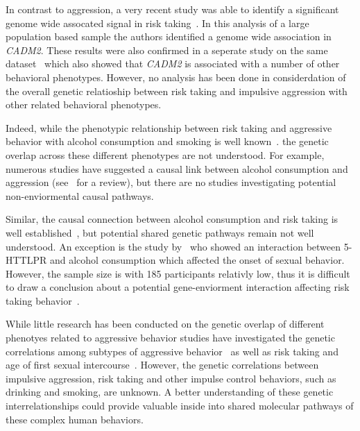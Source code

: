 In contrast to aggression, a very recent study was able to identify a significant genome wide assocated signal in risk taking~\cite{Day2016}. 
In this analysis of a large population based sample the authors identified a genome wide association in \textit{CADM2}.
These results were also confirmed in a seperate study on the same dataset~\cite{Boutwell2017} which also showed that \textit{CADM2} is associated with a number of other behavioral phenotypes.
However, no analysis has been done in considerdation of the overall genetic relatioship between risk taking and impulsive aggression with other related behavioral phenotypes.

Indeed, while the phenotypic relationship between risk taking and aggressive behavior with alcohol consumption and smoking is well known~\cite{FRANZKOWIAX1987,Zuckerman2000,Dakwar2011}.
the genetic overlap across these different phenotypes are not understood.
For example, numerous studies have suggested a causal link between alcohol consumption and aggression (see~\citet{Bushman1990} for a review), but there are no studies investigating potential non-enviormental causal pathways.

Similar, the causal connection between alcohol consumption and risk taking is well established~\cite{Lane2004}, but potential shared genetic pathways remain not well understood.
An exception is the study by~\cite{Kogan2010} who showed an interaction between 5-HTTLPR and alcohol consumption which affected the onset of sexual behavior. 
However, the sample size is with 185 participants relativly low, thus it is difficult to draw a conclusion about a potential gene-enviorment interaction affecting risk taking behavior~\cite{Rubens2016}.

While little research has been conducted on the genetic overlap of different phenotyes related to aggressive behavior studies have investigated the genetic correlations among subtypes of aggressive behavior~\cite{Tuvblad2011a} as well as risk taking and age of first sexual intercourse~\cite{Day2016}.
However, the genetic correlations between impulsive aggression, risk taking and other impulse control behaviors, such as drinking and smoking, are unknown.
A better understanding of these genetic interrelationships could provide valuable inside into shared molecular pathways of these complex human behaviors.

